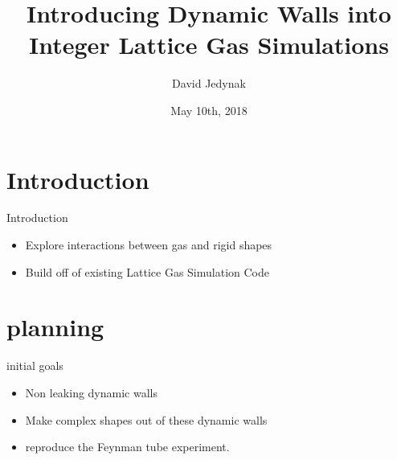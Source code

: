 \documentclass{beamer}
\title[Introducing Dynamic Walls into Integer Lattice Gas Simulations]{Introducing Dynamic Walls into Integer Lattice Gas Simulations}
\author{David Jedynak}
\institute{NDSU}
\date{May 10th, 2018}
\begin{document}
\begin{frame}
  \titlepage
\end{frame}


\section{Introduction}

\begin{frame}{Introduction}

\begin{itemize}
  \item Explore interactions between gas and rigid shapes
  \item Build off of existing Lattice Gas Simulation Code
\end{itemize}

\vskip 1cm

\end{frame}


\section{planning}
\begin{frame}{initial goals}
\begin{itemize}
\item Non leaking dynamic walls
\item Make complex shapes out of these dynamic walls
\item reproduce the Feynman tube experiment. 
\end{itemize}
\end{frame}
\end{document}
